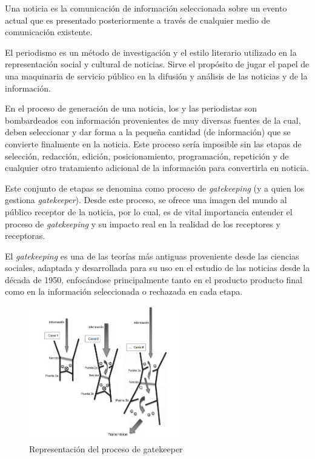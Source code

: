 \label{sec:definicion_problema}

Una noticia es la comunicación de información seleccionada sobre un evento actual que es presentado posteriormente a través de cualquier medio de comunicación existente.\cite{Shirky_2008_Herecomes}

El periodismo es un método de investigación y el estilo literario utilizado en la representación social y cultural de noticias. Sirve el propósito de jugar el papel de una maquinaria de servicio público en la difusión y análisis de las noticias y de la información. \cite{harcup2004journalism} 

En el proceso de generación de una noticia, los y las periodistas son bombardeados con información provenientes de muy diversas fuentes de la cual, deben seleccionar y dar forma a la pequeña cantidad (de información) que se convierte finalmente en la noticia. Este proceso sería imposible sin las etapas de selección, redacción, edición, posicionamiento, programación, repetición y de cualquier otro tratamiento adicional de la información para convertirla en noticia. 

Este conjunto de etapas se denomina como proceso de \emph{gatekeeping} (y a quien los gestiona \emph{gatekeeper}). Desde este proceso, se ofrece una imagen del mundo al público receptor de la noticia, por lo cual, es de vital importancia  entender el proceso de \emph{gatekeeping} y su impacto real en la realidad de los receptores y receptoras.

El \emph{gatekeeping} es una de las teorías más antiguas proveniente desde las ciencias sociales, adaptada y desarrollada para su uso en el estudio de las noticias desde la década de 1950, enfocándose principalmente tanto en el producto producto final como en la información seleccionada o rechazada en cada etapa.

\begin{figure}[h]
  \centering
    \includegraphics[width=0.6\textwidth]{imgs/gatekeeper.png}
  \caption{Representación del proceso de gatekeeper \cite{wahl2008handbook}}
  \label{fig:gatekeeper}
\end{figure}

